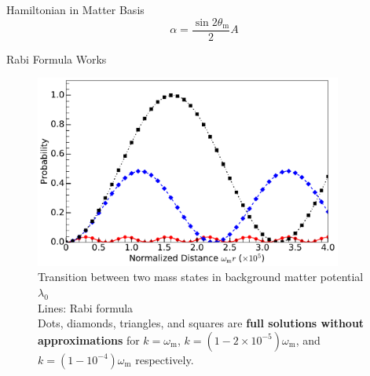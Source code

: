 \documentclass[9pt]{beamer}
\begin{document}
\begin{darkframes}
\begin{frame}{Hamiltonian in Matter Basis}
\begin{equation*}
\alpha = \frac{\sin2\theta_{\mathrm m}}{2}A
\end{equation*}







\end{frame}



\begin{frame}{Rabi Formula Works}



\begin{tcolorbox}[colback=white]
\begin{figure}
\includegraphics[width=0.9\textwidth]{assets/rabiOscillationsNeutrinoCoincidence-single-frequency}
\caption*{
\color{black}Transition between two mass states in background matter potential $\lambda_0$\\
Lines: Rabi formula\\
Dots, diamonds, triangles, and squares are {\bf full solutions without approximations} for {\color{black}$k=\omega_{\mathrm m}$}, {\color{blue}$k=(1-2\times 10^{-5})\omega_{\mathrm m}$}, and {\color{red}$k=(1-10^{-4})\omega_{\mathrm m}$} respectively.
}
\end{figure}
\end{tcolorbox}


\end{frame}
\end{darkframes}
\end{document}
